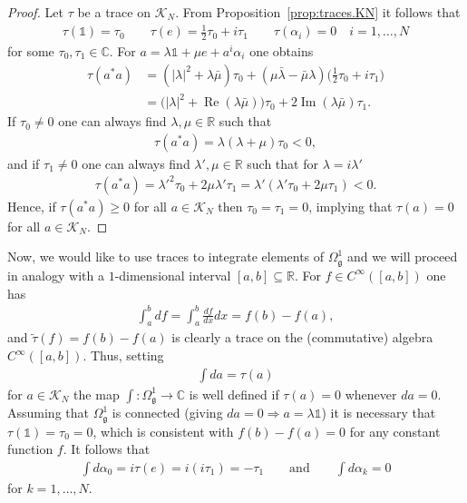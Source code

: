 \documentclass{amsart}
\newcommand{\reals}{\mathbb{R}}
\newcommand{\complex}{\mathbb{C}}
\newcommand{\paraa}[1]{\big(#1\big)}
\theoremstyle{definition}
\theoremstyle{remark}
\numberwithin{equation}{section}
\newcommand{\K}{\mathcal{K}}
\renewcommand{\mid}{\mathds{1}}
\newcommand{\KN}{\K_N}
\newcommand{\qqand}{\qquad\text{and}\qquad}
\newcommand{\g}{\mathfrak{g}}
\newcommand{\Omegaoneg}{\Omega^1_{\g}}
\renewcommand{\Re}{\operatorname{Re}}
\renewcommand{\Im}{\operatorname{Im}}
\begin{document}
\begin{proof}
  Let $\tau$ be a trace on $\KN$. From Proposition~\ref{prop:traces.KN} it follows that
  \begin{align*}
    \tau(\mid) = \tau_0\qquad
    \tau(e) = \tfrac{1}{2}\tau_0+i\tau_1\qquad
    \tau(\alpha_i) = 0\quad i=1,\ldots,N
  \end{align*}
  for some $\tau_0,\tau_1\in\complex$. For
  $a=\lambda\mid+\mu e+a^i\alpha_i$ one obtains
  \begin{align*}
    \tau(a^\ast a)
    &= (|\lambda|^2+\lambda\bar{\mu})\tau_0
    +(\mu\bar{\lambda}-\bar{\mu}\lambda)\paraa{\tfrac{1}{2}\tau_0+i\tau_1}\\
    &= \paraa{|\lambda|^2+\Re(\lambda\bar{\mu})}\tau_0 + 2\Im(\lambda\bar{\mu})\tau_1. 
  \end{align*}
  If $\tau_0\neq 0$ one can always find $\lambda,\mu\in\reals$ such that
  \begin{align*}
    \tau(a^\ast a) = \lambda(\lambda+\mu)\tau_0<0,
  \end{align*}
  and if $\tau_1\neq 0$ one can always find $\lambda',\mu\in\reals$ such that
  for $\lambda=i\lambda'$
  \begin{align*}
    \tau(a^\ast a) = \lambda'^2\tau_0 + 2\mu\lambda'\tau_1
    =\lambda'(\lambda'\tau_0+2\mu\tau_1)<0.
  \end{align*}
  Hence, if $\tau(a^\ast a)\geq 0$ for all $a\in\KN$ then
  $\tau_0=\tau_1=0$, implying that $\tau(a)=0$ for all $a\in\KN$.
\end{proof}

\noindent
Now, we would like to use traces to integrate elements of $\Omegaoneg$
and we will proceed in analogy with a $1$-dimensional interval
$[a,b]\subseteq\reals$. For $f\in C^\infty([a,b])$ one has
\begin{align*}
  \int_a^b df = \int_a^b\frac{df}{dx}dx = f(b)-f(a),
\end{align*}
and $\tilde{\tau}(f)=f(b)-f(a)$ is clearly a trace on the
(commutative) algebra $C^\infty([a,b])$. Thus, setting
\begin{align*}
  \int da = \tau(a)
\end{align*}
for $a\in\KN$ the map $\int:\Omegaoneg\to\complex$ is well defined if
$\tau(a)=0$ whenever $da=0$. Assuming that $\Omegaoneg$ is connected
(giving $da=0\Rightarrow a=\lambda\mid$) it is necessary that
$\tau(\mid)=\tau_0=0$, which is consistent with $f(b)-f(a)=0$ for any
constant function $f$. It follows that
\begin{align*}
  \int d\alpha_0 = i\tau(e) = i(i\tau_1) = -\tau_1\qqand \int d\alpha_k = 0
\end{align*}
for $k=1,\ldots,N$.
\end{document}
